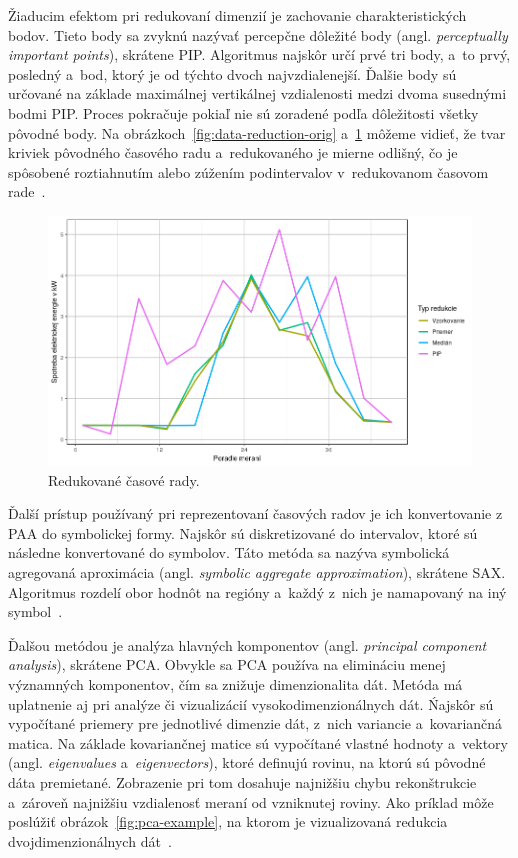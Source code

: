 \documentclass[a4paper,twoside,slovak,12pt,appendix]{article}
\begin{document}
Žiaducim efektom pri redukovaní dimenzií je zachovanie charakteristických bodov.
Tieto body sa zvyknú nazývať percepčne dôležité body (angl. \textit{perceptually
important points}), skrátene PIP. Algoritmus najskôr určí prvé tri body, a~to
prvý, posledný a~bod, ktorý je od týchto dvoch najvzdialenejší. Ďalšie body sú
určované na základe maximálnej vertikálnej vzdialenosti medzi dvoma susednými
bodmi PIP. Proces pokračuje pokiaľ nie sú zoradené podľa dôležitosti všetky
pôvodné body. Na obrázkoch~\ref{fig:data-reduction-orig}
a~\ref{fig:data-reduction-agg} môžeme vidieť, že tvar kriviek pôvodného časového
radu a~redukovaného je mierne odlišný, čo je spôsobené roztiahnutím alebo
zúžením podintervalov v~redukovanom časovom rade~\cite{Fu2011}.

\begin{figure}[htbp]
  \centering
  \includegraphics[width=\textwidth]{data_reduction_agg.png}
  \caption{Redukované časové rady.}
  \label{fig:data-reduction-agg}
\end{figure}

Ďalší prístup používaný pri reprezentovaní časových radov je ich konvertovanie
z PAA do symbolickej formy. Najskôr sú diskretizované do intervalov, ktoré sú
následne konvertované do symbolov. Táto metóda sa nazýva symbolická agregovaná
aproximácia (angl. \textit{symbolic aggregate approximation}), skrátene SAX.
Algoritmus rozdelí obor hodnôt na regióny a~každý z~nich je namapovaný na iný
symbol~\cite{Fu2011}.

Ďalšou metódou je analýza hlavných komponentov (angl. \textit{principal
component analysis}), skrátene PCA. Obvykle sa PCA používa na elimináciu menej
významných komponentov, čím sa znižuje dimenzionalita dát. Metóda má uplatnenie
aj pri analýze či vizualizácií vysokodimenzionálnych dát. Ńajskôr sú vypočítané
priemery pre jednotlivé dimenzie dát, z~nich variancie a~kovariančná matica. Na
základe kovariančnej matice sú vypočítané vlastné hodnoty a~vektory (angl.
\textit{eigenvalues} a~\textit{eigenvectors}), ktoré definujú rovinu, na ktorú
sú pôvodné dáta premietané. Zobrazenie pri tom dosahuje najnižšiu chybu
rekonštrukcie a~zároveň najnižšiu vzdialenosť meraní od vzniknutej roviny. Ako
príklad môže poslúžiť obrázok~\ref{fig:pca-example}, na ktorom je vizualizovaná
redukcia dvojdimenzionálnych dát~\cite{Fu2011,Smith2002}.
\end{document}
